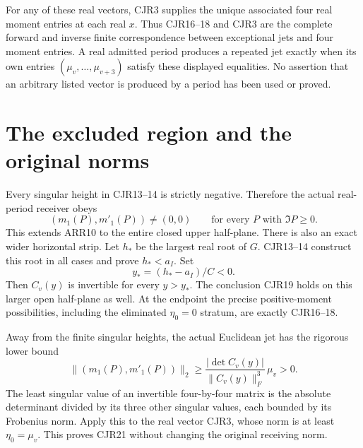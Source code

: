 For any of these real vectors, CJR3 supplies the unique associated
four real moment entries at each real $x$. Thus CJR16--18 and
CJR3 are the complete forward and inverse finite correspondence
between exceptional jets and four moment entries. A real admitted
period produces a repeated jet exactly when its own entries
$(\mu_v,\ldots,\mu_{v+3})$ satisfy these displayed equalities.
No assertion that an arbitrary listed vector is produced by a
period has been used or proved.

\section{The excluded region and the original norms}
Every singular height in CJR13--14 is strictly negative. Therefore
the actual real-period receiver obeys
\[
 (m_1(P),m'_1(P))\ne(0,0)
 \qquad\text{for every }P\text{ with }\Im P\ge0.
 \tag{CJR19}
\]
This extends ARR10 to the entire closed upper half-plane.
There is also an exact wider horizontal strip. Let $h_*$ be the
largest real root of $G$. CJR13--14 construct this root in all
cases and prove $h_*<a_I$. Set
\[
 y_*=(h_*-a_I)/C<0.
 \tag{CJR20}
\]
Then $C_v(y)$ is invertible for every $y>y_*$. The conclusion
CJR19 holds on this larger open half-plane as well. At the endpoint
the precise positive-moment possibilities, including the eliminated
$\eta_0=0$ stratum, are exactly CJR16--18.

Away from the finite singular heights, the actual Euclidean jet
has the rigorous lower bound
\[
 \|(m_1(P),m'_1(P))\|_2
 \ge \frac{|\det C_v(y)|}{\|C_v(y)\|_F^3}\,\mu_v>0.
 \tag{CJR21}
\]
The least singular value of an invertible four-by-four matrix is
the absolute determinant divided by its three other singular
values, each bounded by its Frobenius norm. Apply this to the real
vector CJR3, whose norm is at least $\eta_0=\mu_v$.
This proves CJR21 without changing the original receiving norm.

